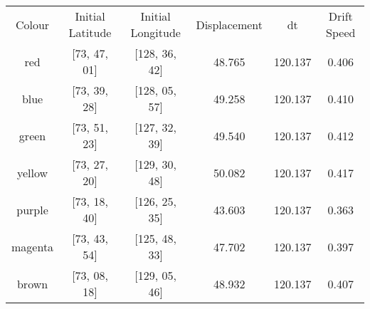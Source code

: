 \begin{tabular}{c|c c c c c}
    Colour & Initial Latitude & Initial Longitude &Displacement & dt & Drift Speed \\
    red & [73, 47, 01] & [128, 36, 42] & 48.765 & 120.137 & 0.406\\
    blue & [73, 39, 28] & [128, 05, 57] & 49.258 & 120.137 & 0.410 \\
    green & [73, 51, 23] & [127, 32, 39] & 49.540 & 120.137 & 0.412 \\
    yellow & [73, 27, 20] & [129, 30, 48] & 50.082 & 120.137 & 0.417 \\
    purple & [73, 18, 40] & [126, 25, 35] & 43.603 & 120.137 & 0.363 \\
    magenta & [73, 43, 54] & [125, 48, 33] & 47.702 & 120.137 & 0.397 \\
    brown & [73, 08, 18] & [129, 05, 46] & 48.932 & 120.137 & 0.407
    
\end{tabular}
